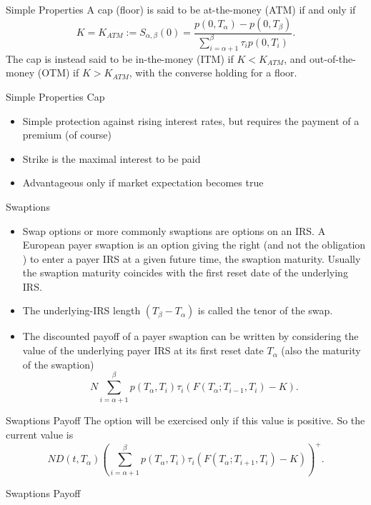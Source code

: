 {Simple Properties}
A cap
(floor) is said to be at-the-money (ATM) if and only if
$$
K=K_{ATM}:=S_{\alpha,\beta}(0)=\frac{p(0,T_{\alpha})-p(0,T_{\beta})}{\sum_{i=\alpha+1}^{\beta}\tau_ip(0,T_i)}.
$$
The cap is instead said to be in-the-money (ITM) if $K<K_{ATM}$,
and out-of-the-money (OTM) if $K>K_{ATM}$, with the converse
holding for a floor.



{Simple Properties Cap}
\begin{itemize}
\item<1-> Simple protection against rising interest rates, but requires the payment of a premium (of course)
\item<2-> Strike is the maximal interest to be paid
\item<3-> Advantageous only if market expectation becomes true
\end{itemize}




{Swaptions}
\begin{itemize}
\item<1->Swap options or more commonly swaptions are options on an IRS. A
European payer swaption is an option giving the right (and not the
obligation ) to enter a payer IRS at a given future time, the
swaption maturity. Usually the swaption maturity coincides with
the first reset date of the underlying IRS.
\item<2->
The underlying-IRS
length $(T_{\beta}-T_{\alpha})$ is called the tenor of the swap.
\item<3-> The discounted payoff of a payer swaption can be written by
considering the value of the underlying payer IRS at its first
reset date $T_{\alpha}$ (also the maturity of the swaption)
$$
N\sum_{i=\alpha+1}^{\beta} p(T_{\alpha},T_i)\tau_i(F(T_{\alpha};T_{i-1},T_i)-K).
$$

\end{itemize}


{Swaptions Payoff}
The option will be exercised only if this
value is positive. So the current value is
$$
ND(t,T_{\alpha})\left(\sum_{i=\alpha+1}^{\beta}p(T_{\alpha},T_i)\tau_i
(F(T_{\alpha};T_{i+1},T_i)-K)\right)^+.
$$


{Swaptions Payoff}


